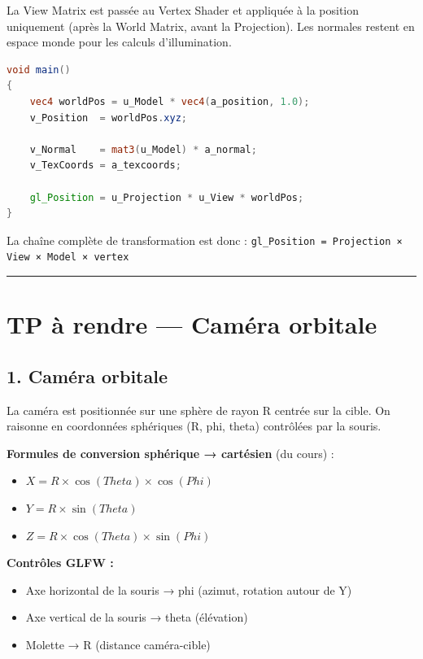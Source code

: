 \documentclass[11pt,a4paper]{article}
\begin{document}
La View Matrix est passée au Vertex Shader et appliquée à la position uniquement (après la World Matrix, avant la Projection). Les normales restent en espace monde pour les calculs d'illumination.

\begin{lstlisting}[language=GLSL]
void main()
{
    vec4 worldPos = u_Model * vec4(a_position, 1.0);
    v_Position  = worldPos.xyz;

    v_Normal    = mat3(u_Model) * a_normal;
    v_TexCoords = a_texcoords;

    gl_Position = u_Projection * u_View * worldPos;
}
\end{lstlisting}

La chaîne complète de transformation est donc : \texttt{gl\_Position = Projection × View × Model × vertex}

\vspace{1em}\hrule\vspace{1em}

\section{TP à rendre — Caméra orbitale}

\subsection{1. Caméra orbitale}

La caméra est positionnée sur une sphère de rayon R centrée sur la cible. On raisonne en coordonnées sphériques (R, phi, theta) contrôlées par la souris.

\textbf{Formules de conversion sphérique → cartésien} (du cours) :
\begin{itemize}
    \item $X = R \times \cos(Theta) \times \cos(Phi)$
    \item $Y = R \times \sin(Theta)$
    \item $Z = R \times \cos(Theta) \times \sin(Phi)$
\end{itemize}

\textbf{Contrôles GLFW :}
\begin{itemize}
    \item Axe horizontal de la souris → phi (azimut, rotation autour de Y)
    \item Axe vertical de la souris → theta (élévation)
    \item Molette → R (distance caméra-cible)
\end{itemize}
\end{document}
